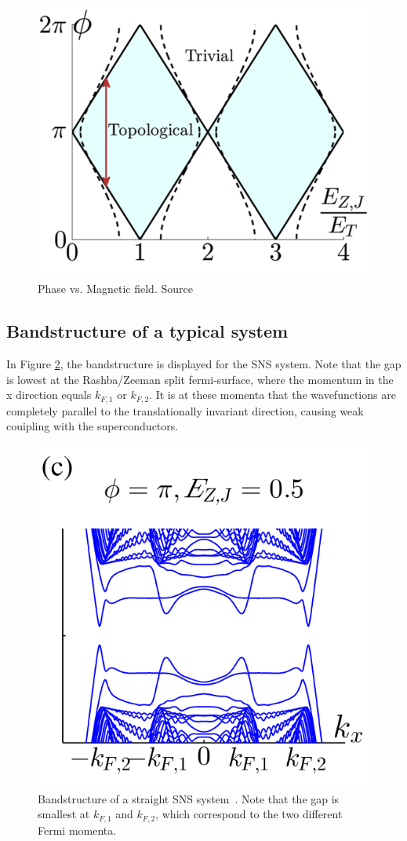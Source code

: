 		\begin{figure}[!htb]
		\centering
		\includegraphics[width=0.5\columnwidth]{figures/pientka_phase_diagram}
		\caption{Phase vs. Magnetic field. Source\cite{pientka_topological_2017}}
		\label{fig:pientka_phase_diagram}
		\end{figure}
			
	\subsection{Bandstructure of a typical system}
		In Figure \ref{fig:pientka_bandstructure}, the bandstructure is displayed for the SNS system.
		Note that the gap is lowest at the Rashba/Zeeman split fermi-surface, where the momentum in the x direction equals $k_{F,1}$ or $k_{F,2}$.
		It is at these momenta that the wavefunctions are completely parallel to the translationally invariant direction, causing weak couipling with the superconductors.

		\begin{figure}[!htb]
		\centering
		\includegraphics[width=0.5\columnwidth]{figures/pientka_bandstructure}
		\caption{Bandstructure of a straight SNS system~\cite{pientka_topological_2017}.
		Note that the gap is smallest at $k_{F,1}$ and $k_{F,2}$, which correspond to the two different Fermi momenta.}
		\label{fig:pientka_bandstructure}
		\end{figure}